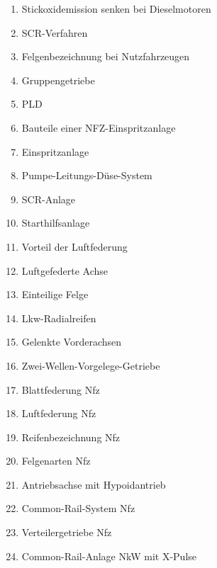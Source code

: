 \begin{enumerate}
\item
  Stickoxidemission senken bei Dieselmotoren\\
\item
  SCR-Verfahren\\
\item
  Felgenbezeichnung bei Nutzfahrzeugen\\
\item
  Gruppengetriebe\\
\item
  PLD\\
\item
  Bauteile einer NFZ-Einspritzanlage\\
\item
  Einspritzanlage\\
\item
  Pumpe-Leitungs-Düse-System\\
\item
  SCR-Anlage\\
\item
  Starthilfsanlage\\
\item
  Vorteil der Luftfederung\\
\item
  Luftgefederte Achse\\
\item
  Einteilige Felge\\
\item
  Lkw-Radialreifen\\
\item
  Gelenkte Vorderachsen\\
\item
  Zwei-Wellen-Vorgelege-Getriebe\\
\item
  Blattfederung Nfz\\
\item
  Luftfederung Nfz\\
\item
  Reifenbezeichnung Nfz\\
\item
  Felgenarten Nfz\\
\item
  Antriebsachse mit Hypoidantrieb\\
\item
  Common-Rail-System Nfz\\
\item
  Verteilergetriebe Nfz\\
\item
  Common-Rail-Anlage NkW mit X-Pulse
\end{enumerate}

